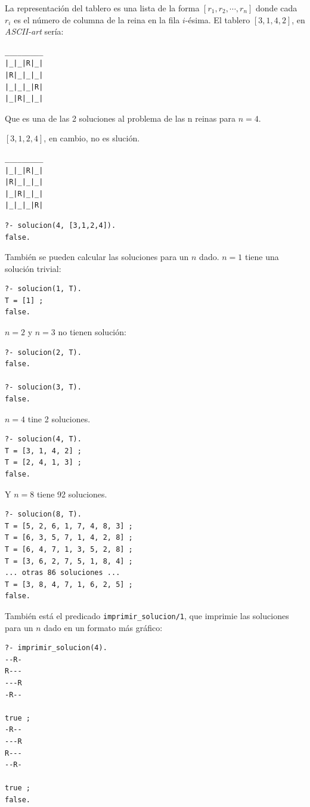\documentclass[12pt,titlepage]{article}
\begin{document}
La representación del tablero es una lista de la forma $[r_1, r_2, \cdots, r_n]$ donde cada $r_i$ es el número de columna de la reina en la fila $i$-ésima. El tablero $[3,1,4,2]$, en \emph{ASCII-art} sería:
\begin{Verbatim}[samepage=true]
_________
|_|_|R|_|
|R|_|_|_|
|_|_|_|R|
|_|R|_|_|
\end{Verbatim}

Que es una de las 2 soluciones al problema de las n reinas para $n=4$.

$[3,1,2,4]$, en cambio, no es slución.

\begin{Verbatim}[samepage=true]
_________
|_|_|R|_|
|R|_|_|_|
|_|R|_|_|
|_|_|_|R|
\end{Verbatim}

\begin{lstlisting}
?- solucion(4, [3,1,2,4]).
false.
\end{lstlisting}

También se pueden calcular las soluciones para un $n$ dado. $n=1$ tiene una solución trivial:
\begin{lstlisting}
?- solucion(1, T).
T = [1] ;
false.
\end{lstlisting}

$n=2$ y $n=3$ no tienen solución:
\begin{lstlisting}
?- solucion(2, T).
false.

?- solucion(3, T).
false.
\end{lstlisting}

$n=4$ tine 2 soluciones.
\begin{lstlisting}
?- solucion(4, T).
T = [3, 1, 4, 2] ;
T = [2, 4, 1, 3] ;
false.
\end{lstlisting}

Y $n=8$ tiene 92 soluciones.
\begin{lstlisting}
?- solucion(8, T).
T = [5, 2, 6, 1, 7, 4, 8, 3] ;
T = [6, 3, 5, 7, 1, 4, 2, 8] ;
T = [6, 4, 7, 1, 3, 5, 2, 8] ;
T = [3, 6, 2, 7, 5, 1, 8, 4] ;
... otras 86 soluciones ...
T = [3, 8, 4, 7, 1, 6, 2, 5] ;
false.
\end{lstlisting}

También está el predicado \lstinline|imprimir_solucion/1|, que imprimie las soluciones para un $n$ dado en un formato más gráfico:
\begin{lstlisting}
?- imprimir_solucion(4).
--R-
R---
---R
-R--

true ;
-R--
---R
R---
--R-

true ;
false.
\end{lstlisting}
\end{document}
